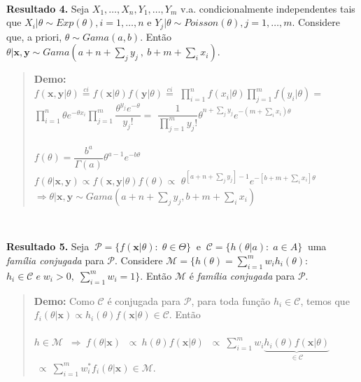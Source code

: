 \documentclass[
]{book}
\begin{document}
\(~\)

\textbf{Resultado 4.} Seja \(X_1,\ldots,X_n,Y_1,\ldots,Y_m\) v.a. condicionalmente independentes tais que \(X_i|\theta\sim Exp(\theta),i=1,\ldots,n\) e \(Y_j|\theta \sim Poisson(\theta),j=1,\ldots,m\). Considere que, a priori, \(\theta \sim Gama(a,b)\). Então \(\theta| \boldsymbol x,\boldsymbol y \sim Gama(a+n+\sum_jy_j~,~b+m+\sum_ix_i)\).

\begin{quote}
\textbf{Demo:}\\
\(f(\boldsymbol x, \boldsymbol y|\theta)\overset{ci}{=}f(\boldsymbol x|\theta)f(\boldsymbol y|\theta)\overset{ci}{=}\) \(\prod_{i=1}^nf(x_i|\theta)\prod_{j=1}^mf(y_i|\theta)=\) \(\prod_{i=1}^n\theta e^{-\theta x_i}\prod_{j=1}^m\dfrac{\theta^{y_j}e^{-\theta}}{y_j!}=\) \(\dfrac{1}{\prod_{j=1}^my_j!}\theta^{n+\sum_j y_j}e^{-(m+\sum_ix_i)\theta}\)\\
\(~\)\\
\(f(\theta)=\dfrac{b^a}{\Gamma(a)}\theta^{a-1}e^{-b\theta}\)
\(~\)\\
\(f(\theta| \boldsymbol{x,y})\propto f(\boldsymbol x, \boldsymbol y|\theta)f(\theta)\propto\) \(\theta^{[a+n+\sum_jy_j]-1}e^{-[b+m+\sum_ix_i]\theta}\)
\(~\)\\
\(\Rightarrow \theta| \boldsymbol x,\boldsymbol y \sim Gama(a+n+\sum_jy_j,b+m+\sum_ix_i)\)
\end{quote}

\(~\)

\textbf{Resultado 5.} Seja \(~\mathcal{P}=\{f(\boldsymbol x|\theta):\; \theta \in \Theta\}~\) e \(~\mathcal{C}=\{h(\theta|a):\;a\in A\}~\) uma \emph{família conjugada} para \(\mathcal{P}\). Considere \(\mathcal{M}=\{h(\theta)=\sum_{i=1}^mw_ih_i(\theta):\) \(h_i \in \mathcal{C} \; e \; w_i>0,\; \sum_{i=1}^m w_i=1\}\). Então \(\mathcal{M}\) é \emph{família conjugada} para \(\mathcal{P}\).

\begin{quote}
\textbf{Demo:} Como \(\mathcal{C}\) é conjugada para \(\mathcal{P}\), para toda função \(h_i \in \mathcal{C}\), temos que \(f_i(\theta|\boldsymbol x)\propto h_i(\theta)f(\boldsymbol x|\theta)\in \mathcal{C}\). Então\\
\(~\)\\
\(h\in \mathcal{M}\) \(~\Rightarrow~ f(\theta|\boldsymbol x)\) \(~\propto~ h(\theta)f(\boldsymbol x|\theta)\) \(~\propto~\sum_{i=1}^m w_i\underbrace{h_i(\theta)f(\boldsymbol x|\theta)}_{\in \mathcal{C}}\) \(~\propto~\sum_{i=1}^m w_i^*f_i(\theta|\boldsymbol x)\in \mathcal{M}\).
\end{quote}
\end{document}
